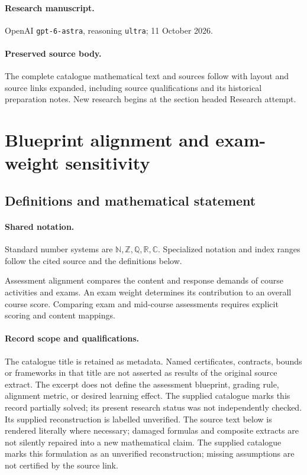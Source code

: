 \documentclass[11pt]{article}
\begin{document}
\paragraph{Research manuscript.} OpenAI \texttt{gpt-6-astra}, reasoning \texttt{ultra}; 11 October 2026.
\paragraph{Preserved source body.} The complete catalogue mathematical text and sources follow with layout and source links expanded, including source qualifications and its historical preparation notes. New research begins at the section headed Research attempt.

\section{Blueprint alignment and exam-weight sensitivity}\label{statement}

\subsection{Definitions and mathematical statement}

\paragraph{Shared notation.}Standard number systems are $\mathbb N,\mathbb Z,\mathbb Q,\mathbb R,\mathbb C$. Specialized notation and index ranges follow the cited source and the definitions below.


Assessment alignment compares the content and response demands of course activities and exams. An exam weight determines its contribution to an overall course score. Comparing exam and mid-course assessments requires explicit scoring and content mappings.
\paragraph{Record scope and qualifications.}
The catalogue title is retained as metadata. Named certificates, contracts, bounds or frameworks in that title are not asserted as results of the original source extract.
The excerpt does not define the assessment blueprint, grading rule, alignment metric, or desired learning effect. The supplied catalogue marks this record partially solved; its present research status was not independently checked. Its supplied reconstruction is labelled unverified.
The source text below is rendered literally where necessary; damaged formulas and composite extracts are not silently repaired into a new mathematical claim.
The supplied catalogue marks this formulation as an unverified reconstruction; missing assumptions are not certified by the source link.
\end{document}
